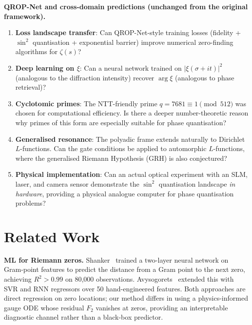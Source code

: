 \documentclass[11pt, a4paper]{article}
\theoremstyle{definition}
\theoremstyle{plain}
\newcommand{\xif}{\xi}                      %
\begin{document}
\smallskip\noindent\textbf{QROP-Net and cross-domain predictions
(unchanged from the original framework).}

\begin{enumerate}
  \item \textbf{Loss landscape transfer}: Can QROP-Net-style training
        losses (fidelity + $\sin^2$ quantisation + exponential barrier)
        improve numerical zero-finding algorithms for $\zeta(s)$?

  \item \textbf{Deep learning on $\xif$}: Can a neural network trained
        on $|\xif(\sigma+it)|^2$ (analogous to the diffraction intensity)
        recover $\arg\xif$ (analogous to phase retrieval)?

  \item \textbf{Cyclotomic primes}: The NTT-friendly prime
        $q = 7681 \equiv 1 \pmod{512}$ was chosen for computational
        efficiency. Is there a deeper number-theoretic reason why
        primes of this form are especially suitable for phase
        quantisation?

  \item \textbf{Generalised resonance}: The polyadic frame extends
        naturally to Dirichlet $L$-functions. Can the gate conditions
        be applied to automorphic $L$-functions, where the generalised
        Riemann Hypothesis (GRH) is also conjectured?

  \item \textbf{Physical implementation}: Can an actual optical
        experiment with an SLM, laser, and camera sensor demonstrate
        the $\sin^2$ quantisation landscape \textit{in hardware},
        providing a physical analogue computer for phase quantisation
        problems?
\end{enumerate}


\section{Related Work}
\label{sec:related}

\noindent\textbf{ML for Riemann zeros.}
Shanker~\cite{Shanker2015NNZeta} trained a two-layer neural network on
Gram-point features to predict the distance from a Gram point to the
next zero, achieving $R^2>0.99$ on 80{,}000 observations.
Avysogorets~\cite{Avysogorets2021RiemannZeta} extended this with SVR
and RNN regressors over 50 hand-engineered features.  Both approaches
are direct regression on zero locations; our method differs in using a
physics-informed gauge ODE whose residual $F_2$ vanishes at zeros,
providing an interpretable diagnostic channel rather than a black-box
predictor.
\end{document}
